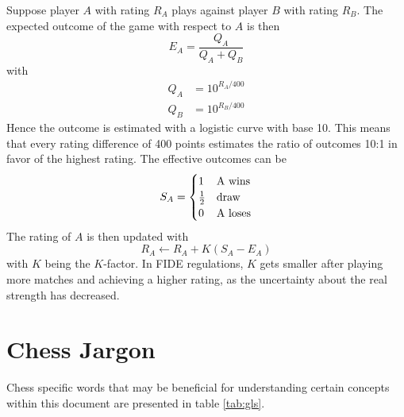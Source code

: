 Suppose player $A$ with rating $R_A$ plays against player $B$ with rating $R_B$. The expected outcome of the game with respect to $A$ is then
\[
E_A=\frac{Q_A}{Q_A+Q_B}
\]
with
\begin{align*}
Q_A&=10^{R_A/400} \\
Q_B&=10^{R_B/400}
\end{align*}
Hence the outcome is estimated with a logistic curve with base 10. This means that every rating difference of 400 points estimates the ratio of outcomes 10:1 in favor of the highest rating. The effective outcomes can be
\begin{equation*}
S_A = \begin{cases} 
   1 & $A$ \text{ wins} \\
   \frac{1}{2} & \text{draw} \\
   0 & $A$ \text{ loses} \\
  \end{cases}
\end{equation*}
The rating of $A$ is then updated with
\[
R_A\leftarrow R_A+K(S_A-E_A)
\]
with $K$ being the $K$-factor. In FIDE regulations, $K$ gets smaller after playing more matches and achieving a higher rating, as the uncertainty about the real strength has decreased.

\section{Chess Jargon}
\label{sec:chessjargon}
Chess specific words that may be beneficial for understanding certain concepts within this document are presented in table \ref{tab:gls}.

